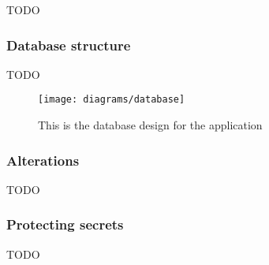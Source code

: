 {TODO}

\subsubsection*{Database structure}

{TODO}

\begin{figure}[H]
    \centering
    \texttt{[image: diagrams/database]}
    \caption{This is the database design for the application}
    \label{fig:diagram_database_image}
\end{figure} 
\noindent

\subsubsection*{Alterations}

{TODO}

\subsubsection*{Protecting secrets}

{TODO}